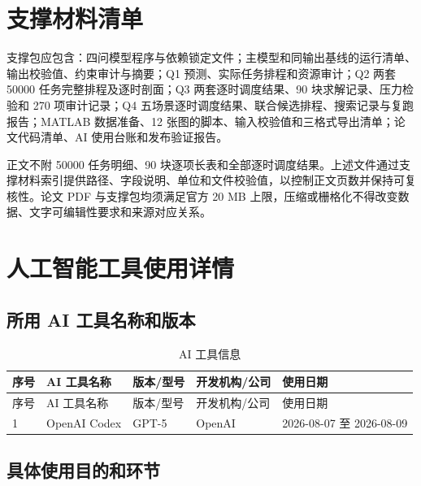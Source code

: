 \section{支撑材料清单}

支撑包应包含：四问模型程序与依赖锁定文件；主模型和同输出基线的运行清单、输出校验值、约束审计与摘要；Q1 预测、实际任务排程和资源审计；Q2 两套 50000 任务完整排程及逐时剖面；Q3 两套逐时调度结果、90 块求解记录、压力检验和 270 项审计记录；Q4 五场景逐时调度结果、联合候选排程、搜索记录与复跑报告；MATLAB 数据准备、12 张图的脚本、输入校验值和三格式导出清单；论文代码清单、AI 使用台账和发布验证报告。

正文不附 50000 任务明细、90 块逐项长表和全部逐时调度结果。上述文件通过支撑材料索引提供路径、字段说明、单位和文件校验值，以控制正文页数并保持可复核性。论文 PDF 与支撑包均须满足官方 20 MB 上限，压缩或栅格化不得改变数据、文字可编辑性要求和来源对应关系。

\section{人工智能工具使用详情}

\subsection{所用 AI 工具名称和版本}

\begin{longtable}{p{}p{}p{}p{}p{}}
\caption{AI 工具信息}\label{tab:ai-tool-info}\\
\toprule
序号 & AI 工具名称 & 版本/型号 & 开发机构/公司 & 使用日期 \\
\midrule
\endfirsthead
\toprule
序号 & AI 工具名称 & 版本/型号 & 开发机构/公司 & 使用日期 \\
\midrule
\endhead
1 & OpenAI Codex & GPT-5 & OpenAI & 2026-08-07 至 2026-08-09 \\
\bottomrule
\end{longtable}

\subsection{具体使用目的和环节}

